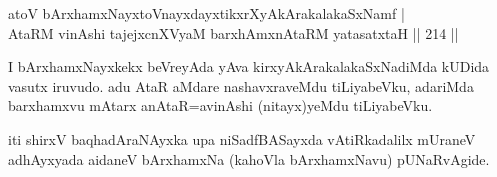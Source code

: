 \begin{shl}
atoV bArxhamxNayxtoV\s nayxdayxtikxrXyAkArakalakaSxNamf |\\
AtaRM vinAshi tajejxcnXVyaM barxhAmxnAtaRM yatasatxtaH \hfill || 214 ||
\end{shl}

\begin{artha}
I bArxhamxNayxkekx beVreyAda yAva kirxyAkArakalakaSxNadiMda kUDida vasutx iruvudo. adu AtaR aMdare nashavxraveMdu tiLiyabeVku, adariMda barxhamxvu mAtarx anAtaR=avinAshi (nitayx)yeMdu tiLiyabeVku. 
\end{artha}

\begin{center}
iti shirxV baqhadAraNAyxka upa niSadfBASayxda vAtiRkadalilx mUraneV adhAyxyada aidaneV bArxhamxNa (kahoVla bArxhamxNavu) pUNaRvAgide.
\end{center}
